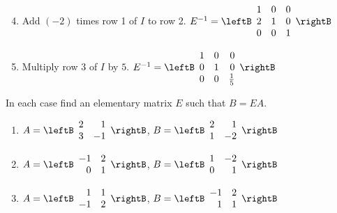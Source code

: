 \begin{multicols}{2}
\begin{ex}
\begin{sol}
\begin{enumerate}[label={\alph*.}]
\setcounter{enumi}{3}
\item Add $(-2)$ times row 1 of $I$ to row 2. $E^{-1} = \leftB \begin{array}{rrr}
1 & 0 & 0 \\
2 & 1 & 0 \\
0 & 0 & 1
\end{array} \rightB$

\setcounter{enumi}{5}
\item Multiply row 3 of $I$ by $5$. $E^{-1} = \leftB \begin{array}{rrr}
1 & 0 & 0 \\
0 & 1 & 0 \\
0 & 0 & \frac{1}{5}
\end{array} \rightB$

\end{enumerate}
\end{sol}
\end{ex}


\begin{ex}
In each case find an elementary matrix $E$ such that $B = EA$.

\begin{enumerate}[label={\alph*.}]
\item $A = \leftB \begin{array}{rr}
2 & 1 \\
3 & -1
\end{array} \rightB$, 
$B = \leftB \begin{array}{rr}
2 & 1 \\
1 & -2
\end{array} \rightB$

\item $A = \leftB \begin{array}{rr}
-1 & 2 \\
0 & 1
\end{array} \rightB$, 
$B = \leftB \begin{array}{rr}
1 & -2 \\
0 & 1
\end{array} \rightB$

\item $A = \leftB \begin{array}{rr}
1 & 1 \\
-1 & 2
\end{array} \rightB$, 
$B = \leftB \begin{array}{rr}
-1 & 2 \\
1 & 1
\end{array} \rightB$


\end{enumerate}
\end{ex}
\end{multicols}
